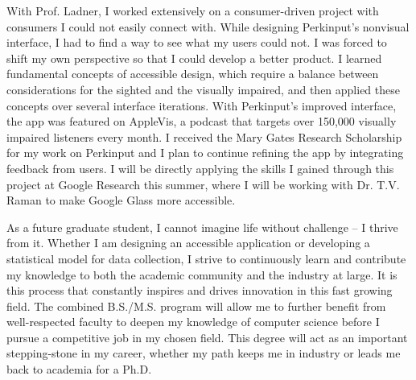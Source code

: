 With Prof. Ladner, I worked extensively on a consumer-driven project with consumers I could not easily connect with. While designing Perkinput’s nonvisual interface, I had to find a way to see what my users could not. I was forced to shift my own perspective so that I could develop a better product. I learned fundamental concepts of accessible design, which require a balance between considerations for the sighted and the visually impaired, and then applied these concepts over several interface iterations. With Perkinput’s improved interface, the app was featured on AppleVis, a podcast that targets over 150,000 visually impaired listeners every month. I received the Mary Gates Research Scholarship for my work on Perkinput and I plan to continue refining the app by integrating feedback from users. I will be directly applying the skills I gained through this project at Google Research this summer, where I will be working with Dr. T.V. Raman to make Google Glass more accessible.\vspace{2 mm}

As a future graduate student, I cannot imagine life without challenge – I thrive from it. Whether I am designing an accessible application or developing a statistical model for data collection, I strive to continuously learn and contribute my knowledge to both the academic community and the industry at large. It is this process that constantly inspires and drives innovation in this fast growing field. The combined B.S./M.S. program will allow me to further benefit from well-respected faculty to deepen my knowledge of computer science before I pursue a competitive job in my chosen field. This degree will act as an important stepping-stone in my career, whether my path keeps me in industry or leads me back to academia for a Ph.D.

